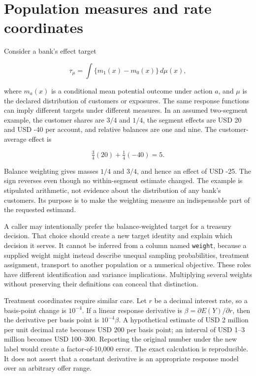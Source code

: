 \hypertarget{population-measures-and-rate-coordinates}{%
\section{Population measures and rate
coordinates}\label{population-measures-and-rate-coordinates}}

Consider a bank's effect target

\[
 \tau_\mu=\int\{m_1(x)-m_0(x)\}\,d\mu(x),
\]

where \(m_a(x)\) is a conditional mean potential outcome under action
\(a\), and \(\mu\) is the declared distribution of customers or
exposures. The same response functions can imply different targets under
different measures. In an assumed two-segment example, the customer
shares are \(3/4\) and \(1/4\), the segment effects are USD 20 and USD
-40 per account, and relative balances are one and nine. The
customer-average effect is

\[
 \tfrac34(20)+\tfrac14(-40)=5.
\]

Balance weighting gives masses \(1/4\) and \(3/4\), and hence an effect
of USD -25. The sign reverses even though no within-segment estimate
changed. The example is stipulated arithmetic, not evidence about the
distribution of any bank's customers. Its purpose is to make the
weighting measure an indispensable part of the requested estimand.
\citep{exec13_interchange_examples}

A caller may intentionally prefer the balance-weighted target for a
treasury decision. That choice should create a new target identity and
explain which decision it serves. It cannot be inferred from a column
named \texttt{weight}, because a supplied weight might instead describe
unequal sampling probabilities, treatment assignment, transport to
another population or a numerical objective. These roles have different
identification and variance implications. Multiplying several weights
without preserving their definitions can conceal that distinction.

Treatment coordinates require similar care. Let \(r\) be a decimal
interest rate, so a basis-point change is \(10^{-4}\). If a linear
response derivative is \(\beta=\partial E(Y)/\partial r\), then the
derivative per basis point is \(10^{-4}\beta\). A hypothetical estimate
of USD 2 million per unit decimal rate becomes USD 200 per basis point;
an interval of USD 1--3 million becomes USD 100--300. Reporting the
original number under the new label would create a factor-of-10,000
error. The exact calculation is reproducible. It does not assert that a
constant derivative is an appropriate response model over an arbitrary
offer range. \citep{exec13_interchange_examples}

